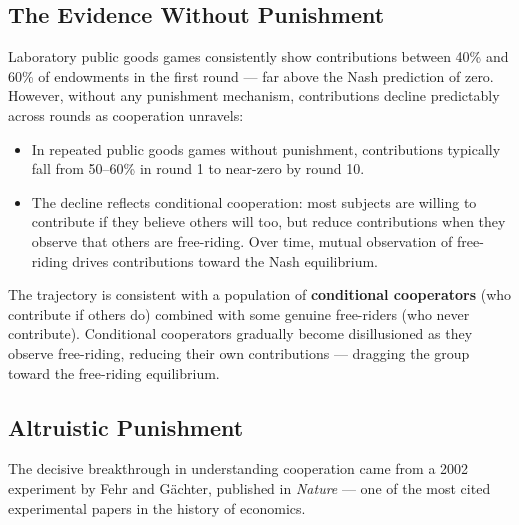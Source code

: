 \documentclass[12pt, letterpaper]{article}
\begin{document}
\subsection{The Evidence Without Punishment}


Laboratory public goods games consistently show contributions between 40\% and 60\% of endowments in the first round --- far above the Nash prediction of zero. However, without any punishment mechanism, contributions decline predictably across rounds as cooperation unravels:

\begin{itemize}
\item In repeated public goods games without punishment, contributions typically fall from 50--60\% in round 1 to near-zero by round 10.
\item The decline reflects conditional cooperation: most subjects are willing to contribute if they believe others will too, but reduce contributions when they observe that others are free-riding. Over time, mutual observation of free-riding drives contributions toward the Nash equilibrium.
\end{itemize}

The trajectory is consistent with a population of \textbf{conditional cooperators} (who contribute if others do) combined with some genuine free-riders (who never contribute). Conditional cooperators gradually become disillusioned as they observe free-riding, reducing their own contributions --- dragging the group toward the free-riding equilibrium.


\subsection{Altruistic Punishment}


The decisive breakthrough in understanding cooperation came from a 2002 experiment by Fehr and Gächter, published in \textit{Nature} --- one of the most cited experimental papers in the history of economics.
\end{document}

